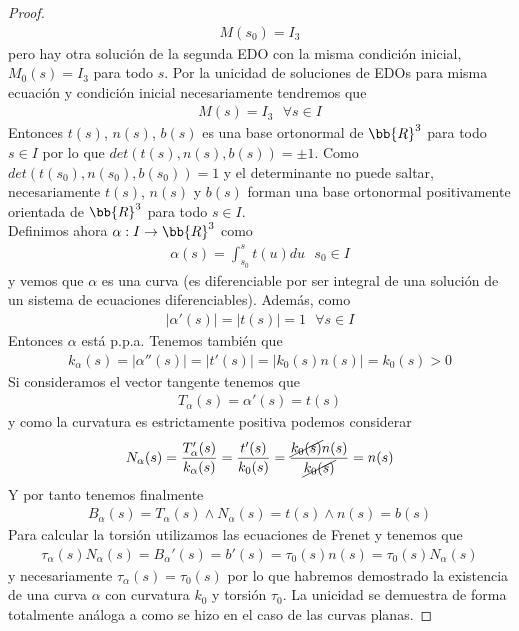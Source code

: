 \begin{teo}
\begin{proof}
        \begin{gather*}
            M(s_0) = I_3
        \end{gather*}
        pero hay otra solución de la segunda EDO con la misma condición inicial, $M_0(s) = I_3$ para todo $s$. Por la unicidad de soluciones de EDOs para misma ecuación y condición inicial necesariamente tendremos que 
        \begin{gather*}
            M(s) = I_3 \ \ \ \forall s \in I
        \end{gather*}
        Entonces $t(s)$, $n(s)$, $b(s)$ es una base ortonormal de $\bb{R}^3$ para todo $s\in I$ por lo que $det(t(s), n(s), b(s)) = \pm 1$. Como $det(t(s_0), n(s_0), b(s_0)) = 1$ y el determinante no puede saltar, necesariamente $t(s)$, $n(s)$ y $b(s)$ forman una base ortonormal positivamente orientada de $\bb{R}^3$ para todo $s\in I$.\\

        Definimos ahora $\alpha:I\to \bb{R}^3$ como 
        \begin{gather*}
            \alpha(s)=\int_{s_0}^{s} t(u) du \ \ \ s_0\in I
        \end{gather*}
        y vemos que $\alpha$ es una curva (es diferenciable por ser integral de una solución de un sistema de ecuaciones diferenciables). Además, como 
        \begin{gather*}
            |\alpha'(s)| = |t(s)|=1\ \ \ \forall s \in I
        \end{gather*}
        Entonces $\alpha$ está p.p.a. Tenemos también que 
        \begin{gather*}
            k_\alpha(s) = |\alpha''(s)| = |t'(s)| = |k_0(s)n(s)| = k_0(s)>0
        \end{gather*}
        Si consideramos el vector tangente tenemos que 
        \begin{gather*}
            T_\alpha(s) = \alpha'(s) = t(s)
        \end{gather*}
        y como la curvatura es estrictamente positiva podemos considerar 
        \begin{gather*}
            N_\alpha(s) = \frac{T'_\alpha(s)}{k_\alpha(s)} = \frac{t'(s)}{k_0(s)} = \frac{\cancel{k_0(s)}n(s)}{\cancel{k_0(s)}} = n(s)
        \end{gather*}
        Y por tanto tenemos finalmente
        \begin{gather*}
            B_\alpha(s) = T_\alpha(s) \wedge N_\alpha(s) = t(s) \wedge n(s) = b(s)
        \end{gather*}
        Para calcular la torsión utilizamos las ecuaciones de Frenet y tenemos que 
        \begin{gather*}
            \tau_\alpha(s)N_\alpha(s) = B_\alpha'(s) = b'(s) = \tau_0(s)n(s) = \tau_0(s)N_\alpha(s)
        \end{gather*}
        y necesariamente $\tau_\alpha(s)=\tau_0(s)$ por lo que habremos demostrado la existencia de una curva $\alpha$ con curvatura $k_0$ y torsión $\tau_0$. La unicidad se demuestra de forma totalmente análoga a como se hizo en el caso de las curvas planas.
    \end{proof}
\end{teo}